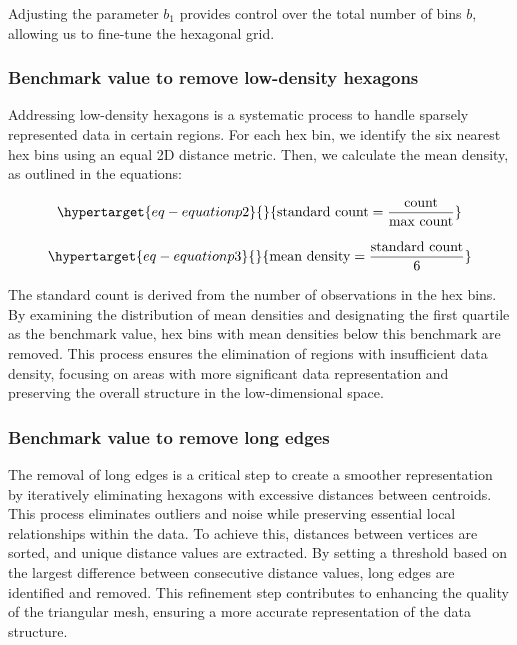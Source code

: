 \documentclass[
  12pt]{article}
\begin{document}
Adjusting the parameter \(b_1\) provides control over the total number
of bins \(b\), allowing us to fine-tune the hexagonal grid.

\hypertarget{benchmark-value-to-remove-low-density-hexagons}{%
\subsubsection{Benchmark value to remove low-density
hexagons}\label{benchmark-value-to-remove-low-density-hexagons}}

Addressing low-density hexagons is a systematic process to handle
sparsely represented data in certain regions. For each hex bin, we
identify the six nearest hex bins using an equal 2D distance metric.
Then, we calculate the mean density, as outlined in the equations:

\begin{equation}\protect\hypertarget{eq-equationp2}{}{
\text{standard count} = \frac{\text{count}}{\text{max count}} 
}\label{eq-equationp2}\end{equation}

\begin{equation}\protect\hypertarget{eq-equationp3}{}{
\text{mean density} = \frac{\text{standard count}}{6} 
}\label{eq-equationp3}\end{equation}

The standard count is derived from the number of observations in the hex
bins. By examining the distribution of mean densities and designating
the first quartile as the benchmark value, hex bins with mean densities
below this benchmark are removed. This process ensures the elimination
of regions with insufficient data density, focusing on areas with more
significant data representation and preserving the overall structure in
the low-dimensional space.

\hypertarget{benchmark-value-to-remove-long-edges}{%
\subsubsection{Benchmark value to remove long
edges}\label{benchmark-value-to-remove-long-edges}}

The removal of long edges is a critical step to create a smoother
representation by iteratively eliminating hexagons with excessive
distances between centroids. This process eliminates outliers and noise
while preserving essential local relationships within the data. To
achieve this, distances between vertices are sorted, and unique distance
values are extracted. By setting a threshold based on the largest
difference between consecutive distance values, long edges are
identified and removed. This refinement step contributes to enhancing
the quality of the triangular mesh, ensuring a more accurate
representation of the data structure.
\end{document}
